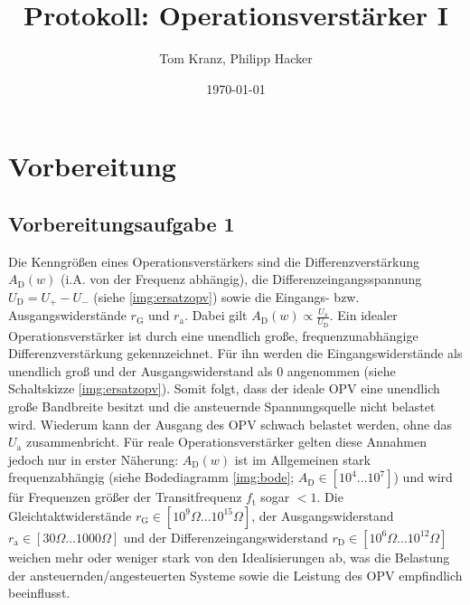 \documentclass[numbers=noenddot,12pt,a4paper]{scrartcl}
\title{Protokoll: Operationsverstärker I}
\author{Tom Kranz, Philipp Hacker}
\date{\today}
\newcommand{\ix}[1]{_\text{#1}}
\begin{document}
\maketitle
\vspace*{\fill}
\tableofcontents
\vfill
\newpage
\section{Vorbereitung}
\subsection{Vorbereitungsaufgabe 1}
Die Kenngrößen eines Operationsverstärkers sind die Differenzverstärkung $A\ix{D}(w)$ (i.A. von der Frequenz abhängig), die Differenzeingangsspannung $U\ix{D}=U_+-U_-$ (siehe \ref{img:ersatzopv}) sowie die Eingangs- bzw. Ausgangswiderstände  $r\ix{G}$ und  $r\ix{a}$. Dabei gilt $A\ix{D}(w)\propto\frac{U\ix{a}}{U\ix{D}}$. Ein idealer Operationsverstärker ist durch eine unendlich große, frequenzunabhängige Differenzverstärkung gekennzeichnet. Für ihn werden die Eingangswiderstände als unendlich groß und der Ausgangswiderstand als 0 angenommen (siehe Schaltskizze \ref{img:ersatzopv}). Somit folgt, dass der ideale OPV eine unendlich große Bandbreite  besitzt und die ansteuernde Spannungsquelle nicht belastet wird. Wiederum kann der Ausgang des OPV schwach belastet werden, ohne das $U\ix{a}$ zusammenbricht. Für reale Operationsverstärker gelten diese Annahmen jedoch nur in erster Näherung: $A\ix{D}(w)$ ist im Allgemeinen stark frequenzabhängig (siehe Bodediagramm \ref{img:bode}; $A\ix{D}\in\left[10^4\dots10^7\right]$) und wird für Frequenzen größer der Transitfrequenz $f\ix{t}$ sogar $<1$. Die Gleichtaktwiderstände $r\ix{G}\in\left[10^9\Omega\dots10^{15}\Omega\right]$, der Ausgangswiderstand $r\ix{a}\in\left[30\Omega\dots1000\Omega\right]$ und der Differenzeingangswiderstand $r\ix{D}\in\left[10^6\Omega\dots10^{12}\Omega\right]$ weichen mehr oder weniger stark von den Idealisierungen ab, was die Belastung der ansteuernden/angesteuerten Systeme sowie die Leistung des OPV empfindlich beeinflusst.
\end{document}
